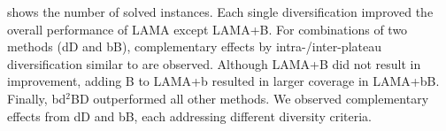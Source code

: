 
% 


 shows the number of solved instances.
Each single diversification improved the overall performance of LAMA except LAMA+B.
For combinations of two methods (dD and bB),
complementary effects by intra-/inter-plateau diversification similar to  are observed.
Although LAMA+B did not result in improvement, adding B to LAMA+b resulted in larger coverage in LAMA+bB.
Finally, bd$^2$BD outperformed all other methods.
We observed complementary effects from dD and bB, each addressing different diversity criteria.




